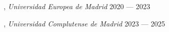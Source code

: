 
, \textit{Universidad Europea de Madrid}	\hfill 2020 --- 2023

, \textit{Universidad Complutense de Madrid} \hfill	2023 --- 2025




